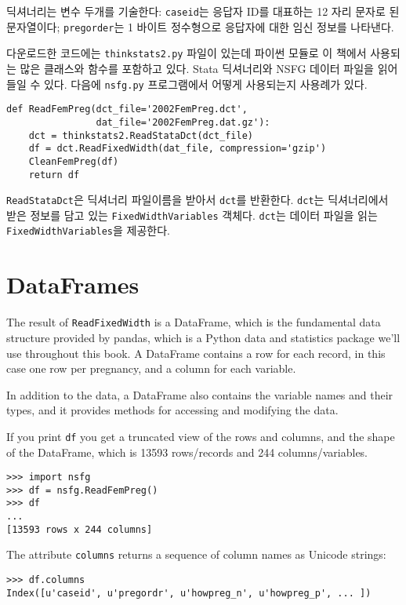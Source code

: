 딕셔너리는 변수 두개를 기술한다: {\tt caseid}는 응답자 ID를 대표하는 12 자리 문자로 된 문자열이다;
 {\tt pregorder}는 1 바이트 정수형으로 응답자에 대한 임신 정보를 나타낸다.

다운로드한 코드에는 {\tt thinkstats2.py} 파일이 있는데 파이썬 모듈로 이 책에서 사용되는 많은 클래스와 함수를 포함하고 있다. 
Stata 딕셔너리와 NSFG 데이터 파일을 읽어 들일 수 있다. 다음에 {\tt nsfg.py} 프로그램에서 어떻게 사용되는지 사용례가 있다.

\begin{verbatim}
def ReadFemPreg(dct_file='2002FemPreg.dct',
                dat_file='2002FemPreg.dat.gz'):
    dct = thinkstats2.ReadStataDct(dct_file)
    df = dct.ReadFixedWidth(dat_file, compression='gzip')
    CleanFemPreg(df)
    return df
\end{verbatim}

{\tt ReadStataDct}은 딕셔너리 파일이름을 받아서 {\tt dct}를 반환한다.
{\tt dct}는 딕셔너리에서 받은 정보를 담고 있는 {\tt FixedWidthVariables} 객체다.
{\tt dct}는 데이터 파일을 읽는 {\tt FixedWidthVariables}을 제공한다.

\section{DataFrames}
\label{dataframe}

The result of {\tt ReadFixedWidth} is a DataFrame, which is the
fundamental data structure provided by pandas, which is a Python
data and statistics package we'll use throughout this book.
A DataFrame contains a
row for each record, in this case one row per pregnancy, and a column
for each variable.

In addition to the data, a DataFrame also contains the variable
names and their types, and it provides methods for accessing and modifying
the data.

If you print {\tt df} you get a truncated view of the rows and
columns, and the shape of the DataFrame, which is 13593
rows/records and 244 columns/variables.

\begin{verbatim}
>>> import nsfg
>>> df = nsfg.ReadFemPreg()
>>> df
...
[13593 rows x 244 columns]
\end{verbatim}

The attribute {\tt columns} returns a sequence of column
names as Unicode strings:

\begin{verbatim}
>>> df.columns
Index([u'caseid', u'pregordr', u'howpreg_n', u'howpreg_p', ... ])
\end{verbatim}

